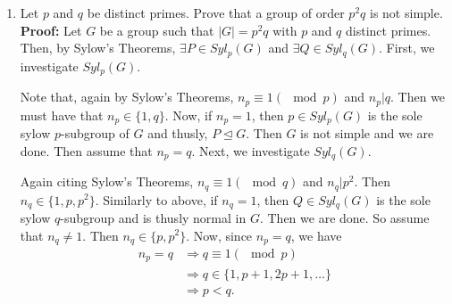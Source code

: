 \documentclass{article}
\begin{document}
\begin{enumerate}
    \textbf{Case $2$: $n_7 = 1$}\\
    Assume that $n_7=1$. Then, as in the first case, $P_7 \trianglelefteq G$, which gives us that $P_5P_7=P_7P_5$, and thusly $P_5P_7 \leq G$.

    Then we need only show that $P_5P_7$ is cyclic and normal in $G$. First, we tackle cyclic. Then we consider the number of Sylow-$5$ 
    subgroups of $P_5P_7$ and the number of Sylow-$7$ subgroups of $P_5P_7$. First, note that $n_5 \equiv 1(\mod{5})$ and $n_5 \big| 7$, so 
    we must have that $n_5 = 1$. Similarly, $n_7 \equiv 1(\mod{7})$ and $n_7 \big| 5$, so we must have that $n_7 = 1$. Then $P_5 
    \trianglelefteq P_5P_7$ and $P_7 \trianglelefteq P_5P_7$. Further, as in above, $P_5 \cap P_7 = \{e\}$. Then, by the normal factoring
    lemma, we must have that $P_5P_7 \cong \mathbb{Z}_{35}$, so $P_5P_7$ is cyclic.

    Lastly, we consider normalcy. In doing so, we consider the quotient group $\sfrac{G}{P_5P_7}$. Note that, since both $G$ and $P_5P_7$ are
    finite, $\big| \sfrac{G}{P_5P_7} \big| = \sfrac{|G|}{|P_5P_7|} = \sfrac{105}{35} = 3 = [G:P_5P_7]$. Since $3$ is prime and $3 \big| |G|$,
    we must have that $P_5P_7 \trianglelefteq G$. $\square$

    \item Let $p$ and $q$ be distinct primes. Prove that a group of order $p^2q$ is not simple.\\
    \textbf{Proof:} Let $G$ be a group such that $|G| = p^2q$ with $p$ and $q$ distinct primes. Then, by Sylow's Theorems, $\exists P \in 
    Syl_p(G)$ and $\exists Q \in Syl_q(G)$. First, we investigate $Syl_p(G)$. 

    Note that, again by Sylow's Theorems, $n_p \equiv 1(\mod{p})$ and $n_p \big| q$. Then we must have that $n_p \in \{1,q\}$. Now, if $n_p 
    = 1$, then $p \in Syl_p(G)$ is the sole sylow $p$-subgroup of $G$ and thusly, $P \trianglelefteq G$. Then $G$ is not simple and we are 
    done. 
    Then assume that $n_p = q$. Next, we investigate $Syl_q(G)$. 

    Again citing Sylow's Theorems, $n_q \equiv 1(\mod{q})$ and $n_q \big| p^2$. Then $n_q \in \{1,p,p^2\}$. Similarly to above, if $n_q = 1$, 
    then $Q \in Syl_q(G)$ is the sole sylow $q$-subgroup and is thusly normal in $G$. Then we are done. So assume that $n_q \neq 1$. Then 
    $n_q \in \{p,p^2\}$. Now, since $n_p = q$, we have
    \begin{align*}
        n_p = q &\Longrightarrow q \equiv 1(\mod{p}) \\
        &\Longrightarrow q \in \{1,p+1,2p+1, \dots \} \\
        &\Longrightarrow p < q.
    \end{align*}


\end{enumerate}
\end{document}
